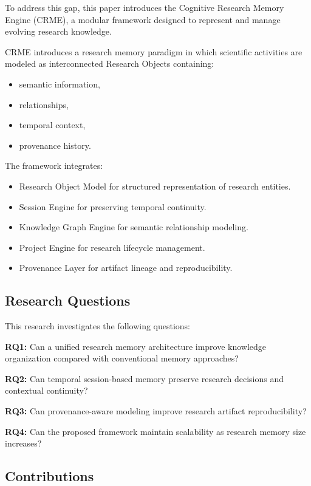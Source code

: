 To address this gap, this paper introduces the Cognitive Research Memory Engine (CRME), a modular framework designed to represent and manage evolving research knowledge.

CRME introduces a research memory paradigm in which scientific activities are modeled as interconnected Research Objects containing:

\begin{itemize}
\item semantic information,
\item relationships,
\item temporal context,
\item provenance history.
\end{itemize}

The framework integrates:

\begin{itemize}
\item Research Object Model for structured representation of research entities.
\item Session Engine for preserving temporal continuity.
\item Knowledge Graph Engine for semantic relationship modeling.
\item Project Engine for research lifecycle management.
\item Provenance Layer for artifact lineage and reproducibility.
\end{itemize}


\subsection{Research Questions}

This research investigates the following questions:

\textbf{RQ1:}
Can a unified research memory architecture improve knowledge organization compared with conventional memory approaches?

\textbf{RQ2:}
Can temporal session-based memory preserve research decisions and contextual continuity?

\textbf{RQ3:}
Can provenance-aware modeling improve research artifact reproducibility?

\textbf{RQ4:}
Can the proposed framework maintain scalability as research memory size increases?


\subsection{Contributions}

